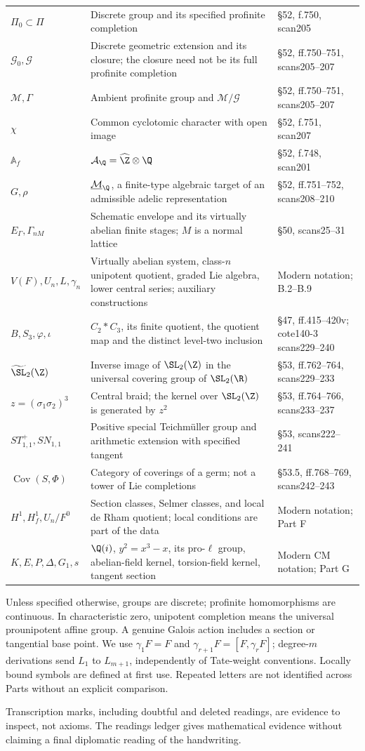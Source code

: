 \begin{longtable}{p{}p{}p{}}
$\Pi_0\subset\Pi$ & Discrete group and its specified profinite completion & \S52, f.750, scan205\\
$\mathcal G_0,\mathcal G$ & Discrete geometric extension and its closure; the closure need not be its full profinite completion & \S52, ff.750--751, scans205--207\\
$\mathcal M,\Gamma$ & Ambient profinite group and $\mathcal M/\mathcal G$ & \S52, ff.750--751, scans205--207\\
$\chi$ & Common cyclotomic character with open image & \S52, f.751, scan207\\
$\mathbb A_f$ & $\mathcal A_\Q=\widehat\Z\otimes\Q$ & \S52, f.748, scan201\\
$G,\rho$ & $\underline{\mathcal M}_\Q$, a finite-type algebraic target of an admissible adelic representation & \S52, ff.751--752, scans208--210\\
$E_\Gamma,\Gamma_{nM}$ & Schematic envelope and its virtually abelian finite stages; $M$ is a normal lattice & \S50, scans25--31\\
$V(F),U_n,L,\gamma_n$ & Virtually abelian system, class-$n$ unipotent quotient, graded Lie algebra, lower central series; auxiliary constructions & Modern notation; B.2--B.9\\
$B,S_3,\varphi,\iota$ & $C_2*C_3$, its finite quotient, the quotient map and the distinct level-two inclusion & \S47, ff.415--420v; cote140-3 scans229--240\\
$\widetilde{\SL}_2(\Z)$ & Inverse image of $\SL_2(\Z)$ in the universal covering group of $\SL_2(\R)$ & \S53, ff.762--764, scans229--233\\
$z=(\sigma_1\sigma_2)^3$ & Central braid; the kernel over $\SL_2(\Z)$ is generated by $z^2$ & \S53, ff.764--766, scans233--237\\
$ST^+_{1,1},SN_{1,1}$ & Positive special Teichm\"uller group and arithmetic extension with specified tangent & \S53, scans222--241\\
$\operatorname{Cov}(S,\Phi)$ & Category of coverings of a germ; not a tower of Lie completions & \S53.5, ff.768--769, scans242--243\\
$H^1,H^1_f,U_n/F^0$ & Section classes, Selmer classes, and local de Rham quotient; local conditions are part of the data & Modern notation; Part F\\
$K,E,P,\Delta,G_1,s$ & $\Q(i)$, $y^2=x^3-x$, its pro-$\ell$ group, abelian-field kernel, torsion-field kernel, tangent section & Modern CM notation; Part G\\
\bottomrule
\end{longtable}
\endgroup
\smallskip
Unless specified otherwise, groups are discrete; profinite homomorphisms
are continuous. In characteristic zero, unipotent completion means the
universal prounipotent affine group. A genuine Galois action includes a
section or tangential base point. We use $\gamma_1F=F$ and
$\gamma_{r+1}F=[F,\gamma_rF]$; degree-$m$ derivations send $L_1$ to
$L_{m+1}$, independently of Tate-weight conventions. Locally bound symbols
are defined at first use. Repeated letters are not identified across Parts
without an explicit comparison.

Transcription marks, including doubtful and deleted readings, are evidence
to inspect, not axioms. The readings ledger gives mathematical evidence
without claiming a final diplomatic reading of the handwriting.
\clearpage
